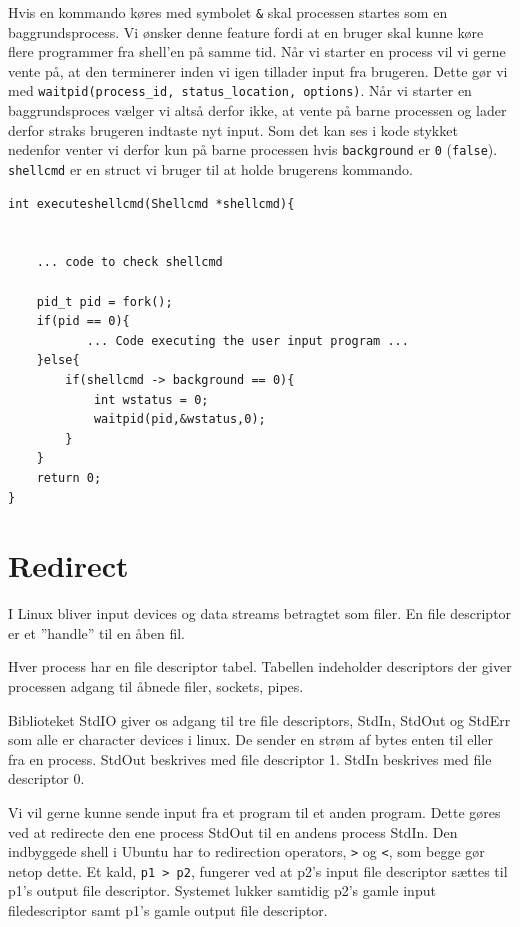 \documentclass[danish]{report}
\begin{document}
Hvis en kommando køres med symbolet {\tt \&} skal processen startes som en baggrundsprocess. Vi ønsker denne feature fordi at en bruger skal kunne køre flere programmer fra shell'en på samme tid. Når vi starter en process vil vi gerne vente på, at den terminerer inden vi igen tillader input fra brugeren. Dette gør vi med {\tt waitpid(process\_id, status\_location, options)}. Når vi starter en baggrundsproces vælger vi altså derfor ikke, at vente på barne processen og lader derfor straks brugeren indtaste nyt input. Som det kan ses i kode stykket nedenfor venter vi derfor kun på barne processen hvis {\tt background} er {\tt 0} ({\tt false}). {\tt shellcmd} er en struct vi bruger til at holde brugerens kommando. 
\begin{lstlisting}
int executeshellcmd(Shellcmd *shellcmd){
    

    ... code to check shellcmd

    pid_t pid = fork();
    if(pid == 0){
           ... Code executing the user input program ...
    }else{
        if(shellcmd -> background == 0){
            int wstatus = 0;    
            waitpid(pid,&wstatus,0);
        }
    }
    return 0;
}
\end{lstlisting}

\section{Redirect}
\label{redirect}
I Linux bliver input devices og data streams betragtet som filer. En file descriptor er et ''handle'' til en åben fil.

Hver process har en file descriptor tabel. Tabellen indeholder descriptors der giver processen adgang til åbnede filer, sockets, pipes.   

Biblioteket StdIO giver os adgang til tre file descriptors, StdIn, StdOut og StdErr som alle er character devices i linux. De sender en strøm af bytes enten til eller fra en process. StdOut  beskrives med file descriptor 1. StdIn beskrives med file descriptor 0. 

Vi vil gerne kunne sende input fra et program til et anden program. Dette gøres ved at redirecte den ene process StdOut til en andens process StdIn. Den indbyggede shell i Ubuntu har to redirection operators, {\tt >} og {\tt <}, som begge gør netop dette. Et kald, {\tt p1 > p2}, fungerer ved at p2's input file descriptor sættes til p1's output file descriptor. Systemet lukker samtidig p2's gamle input filedescriptor samt p1's gamle output file descriptor. 
\end{document}
